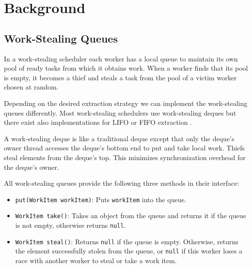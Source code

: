 
\chapter{Background}
\label{chap:queues-background}

\section{Work-Stealing Queues}
\label{sec:queues-background-work-stealing-queues}

In a work-stealing scheduler each worker has a local queue to maintain
its own pool of ready tasks from which it obtains work. When a worker
finds that its pool is empty, it becomes a thief and steals a task
from the pool of a victim worker chosen at random.

Depending on the desired extraction strategy we can implement the
work-stealing queues differently. Most work-stealing schedulers use
work-stealing deques \cite{Arora1998, Acar2000, Blumofe1995,
  Frigo1998, Danaher2005} but there exist also implementations for
LIFO or FIFO extraction \cite{Michael2009}.

A work-stealing deque is like a traditional deque \cite{Knuth1997}
except that only the deque's owner thread accesses the deque's bottom
end to put and take local work. Thiefs steal elements from the deque's
top. This minimizes synchronization overhead for the deque's owner.

All work-stealing queues provide the following three methods in their
interface:

\begin{itemize}
\item \lstinline!put(WorkItem workItem)!: Puts \lstinline!workItem!
  into the queue.
\item \lstinline!WorkItem take()!: Takes an object from the queue and
  returns it if the queue is not empty, otherwise returns
  \lstinline!null!.
\item \lstinline!WorkItem steal()!: Returns \lstinline!null! if the
  queue is empty. Otherwise, returns the element successfully stolen
  from the queue, or \lstinline!null! if this worker loses a race with
  another worker to steal or take a work item.
\end{itemize}

